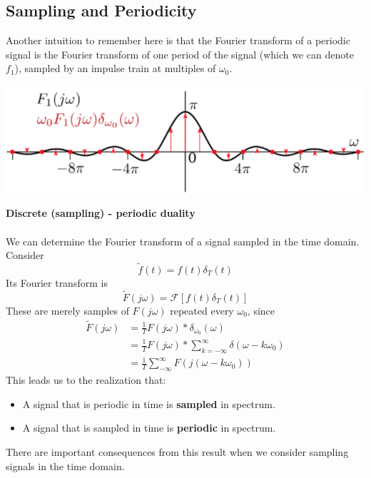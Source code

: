 \documentclass[10pt]{article}
\newcommand{\fourier}{\mathcal{F}}
\begin{document}
\subsection*{Sampling and Periodicity}
Another intuition to remember here is that the Fourier transform of a periodic signal is the Fourier transform of one period of the signal (which we can denote $f_1$), sampled by an impulse train at multiples of $\omega_0$.
\begin{center}
    \includegraphics*[width=\textwidth]{W8_9.png}
\end{center}
\textbf{Discrete (sampling) - periodic duality}\\\\
We can determine the Fourier transform of a signal sampled in the time domain.  Consider
\[\tilde{f}(t) = f(t) \delta_T(t)\]
Its Fourier transform is
\[\tilde{F}(j\omega) = \fourier[f(t) \delta_T(t)]\]
These are merely samples of $F(j\omega)$ repeated every $\omega_0$, since
\begin{align*}
    \tilde{F}(j\omega) &= \frac{1}{T} F(j\omega) * \delta_{\omega_0}(\omega)\\
    &= \frac{1}{T} F(j\omega) * \sum_{k=-\infty}^\infty \delta(\omega - k\omega_0)\\
    &= \frac{1}{T} \sum_{-\infty}^\infty F(j(\omega - k\omega_0))
\end{align*}
This leads us to the realization that:
\begin{itemize}
    \item A signal that is periodic in time is \textbf{sampled} in spectrum.
    \item A signal that is sampled in time is \textbf{periodic} in spectrum.
\end{itemize}
There are important consequences from this result when we consider sampling signals in the time domain.
\end{document}
